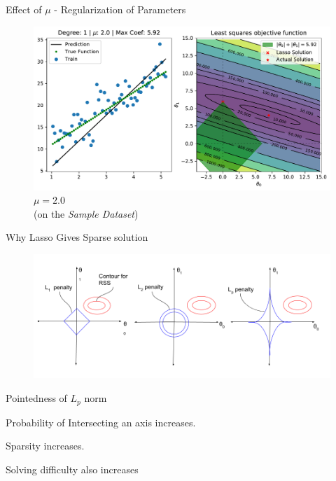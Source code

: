 \documentclass{beamer}
\begin{document}
\begin{frame}{Effect of $\mu$ - Regularization of Parameters}
\vspace{0.4cm}
\begin{figure}\includegraphics[width=0.9\linewidth]{Lasso/lasso_2.0.pdf}\caption{$\mu = 2.0$\\(on the \emph{Sample Dataset})}
\end{figure}
\end{frame}

\begin{frame}{Why Lasso Gives Sparse solution}
\begin{figure}
    \centering
    \includegraphics[scale = 0.4]{Lasso/lasso_2.png}
    \label{fig:my_label}
\end{figure}
\begin{itemize}
\small{
    \item Pointedness of $L_{p}$ norm 
    \item  Probability of Intersecting an axis increases.
    \item Sparsity increases. 
    \item Solving difficulty also increases
    }
\end{itemize}

\end{frame}
\end{document}
